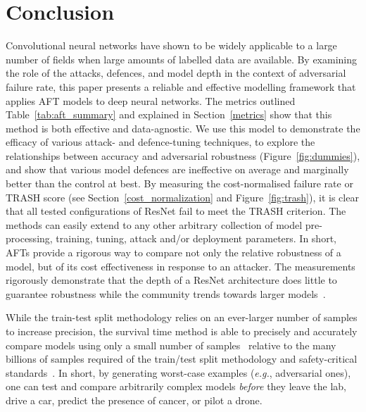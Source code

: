 \section{Conclusion}
Convolutional neural networks have shown to be widely applicable to a large number of fields when large amounts of labelled data are available.
By examining the role of the attacks, defences, and model depth in the context of adversarial failure rate, this paper presents a reliable and effective modelling framework that applies AFT models to deep neural networks.
The metrics outlined Table~\ref{tab:aft_summary} and explained in Section~\ref{metrics} show that this method is both effective and data-agnostic.
We use this model to demonstrate the efficacy of various attack- and defence-tuning techniques, to  explore the relationships between accuracy and adversarial robustness (Figure~\ref{fig:dummies}), and show that various model defences are ineffective on average and marginally better than the control at best.
By measuring the cost-normalised failure rate or TRASH score (see Section~\ref{cost_normalization} and Figure~\ref{fig:trash}), it is clear that all tested configurations of ResNet fail to meet the TRASH criterion.
The methods can easily extend to any other arbitrary collection of model pre-processing, training, tuning, attack and/or deployment parameters.
In short, AFTs provide a rigorous way to compare not only the relative robustness of a model, but of its cost effectiveness in response to an attacker.
The measurements rigorously demonstrate  that the depth of a ResNet architecture does little to guarantee robustness while the community trends towards larger models~\cite{desislavov2021compute}.

While the train-test split methodology relies on an ever-larger number of samples to increase precision, the survival time method is able to precisely and accurately compare models using only a small number of samples~\cite{schmoor2000sample,lachin1981introduction} relative to the many billions of samples required of the train/test split methodology and safety-critical standards~\cite{iso26262,IEC61508,IEC62034,meyers}.
In short, by generating worst-case examples (\textit{e.g.}, adversarial ones), one can test and compare arbitrarily complex models \textit{before} they leave the lab, drive a car, predict the presence of cancer, or pilot a drone.
